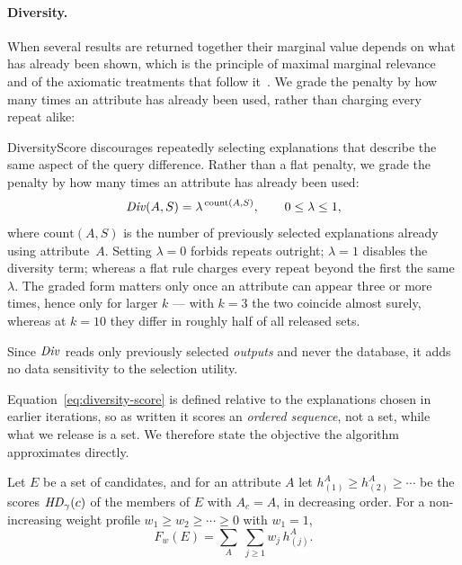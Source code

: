 \paragraph{Diversity.}
When several results are returned together their marginal value depends on what has already been shown, which is the principle of maximal marginal relevance~\cite{MMR} and of the axiomatic treatments that follow it~\cite{GollapudiS09,LinBilmes11}.
We grade the penalty by how many times an attribute has already been used, rather than charging every repeat alike:

DiversityScore discourages repeatedly selecting explanations that describe the same aspect of the query difference.
Rather than a flat penalty, we grade the penalty by how many times an attribute has already been used:
\begin{equation}
\mathit{Div}(A,S)=\lambda^{\,\mathrm{count}(A,S)},
\qquad 0\le\lambda\le1,
\label{eq:diversity-score}
\end{equation}
where $\mathrm{count}(A,S)$ is the number of previously selected explanations already using attribute~$A$.
Setting $\lambda=0$ forbids repeats outright; $\lambda=1$ disables the diversity term; whereas a flat rule charges every repeat beyond the first the same $\lambda$.
The graded form matters only once an attribute can appear three or more times, hence only for larger $k$ --- with $k=3$ the two coincide almost surely, whereas at $k=10$ they differ in roughly half of all released sets.

Since $\mathit{Div}$ reads only previously selected \emph{outputs} and never the database, it adds no data sensitivity to the selection utility.
\label{subsubsec:set-objective}

Equation~\eqref{eq:diversity-score} is defined relative to the explanations chosen in earlier iterations, so as written it scores an \emph{ordered sequence}, not a set, while what we release is a set.
We therefore state the objective the algorithm approximates directly.

\begin{definition}
\label{def:setobj}
Let $E$ be a set of candidates, and for an attribute $A$ let
$h^A_{(1)}\ge h^A_{(2)}\ge\cdots$ be the scores $\mathit{HD}_\gamma(c)$ of the members of $E$ with $A_c=A$, in decreasing order.
For a non-increasing weight profile $w_1\ge w_2\ge\cdots\ge0$ with $w_1=1$,
\begin{equation}
F_w(E)=\sum_{A}\;\sum_{j\ge1} w_j\, h^A_{(j)} .
\label{eq:set-objective}
\end{equation}
\end{definition}

